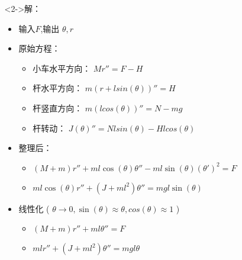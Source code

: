 \documentclass{beamer}
\begin{document}
\begin{frame}[t]
\begin{columns}
\begin{column}{0.23\textwidth}
\begin{block}
\end{block}
\end{column}
\begin{column}{0.77\textwidth}
\begin{block}<2->{解：}
\label{sec-5-1-2}


\begin{itemize}
\item 输入$F$,输出 $\theta,r$
\item 原始方程：
\begin{itemize}
\item 小车水平方向： $Mr''=F-H$
\item 杆水平方向： $m(r+l sin(\theta))'' = H$
\item 杆竖直方向： $m (l cos(\theta))'' = N-mg$
\item 杆转动： $J(\theta)''=N l sin(\theta) - H l cos(\theta)$
\end{itemize}
\item 整理后：
\begin{itemize}
\item $(M+m)r''+ml\cos(\theta)\theta''-ml\sin(\theta)(\theta')^2=F$
\item $ml\cos(\theta)r''+(J+m l^2)\theta''=mgl\sin(\theta)$
\end{itemize}
\item 线性化 ( $\theta\rightarrow 0,\sin(\theta)\approx \theta,cos(\theta)\approx 1$ )
\begin{itemize}
\item $(M+m)r''+ml\theta'' = F$
\item $ml r'' +(J+ml^2)\theta''=mgl\theta$
\end{itemize}
\end{itemize}
\end{block}
\end{column}
\end{columns}
\end{frame}
\end{document}
